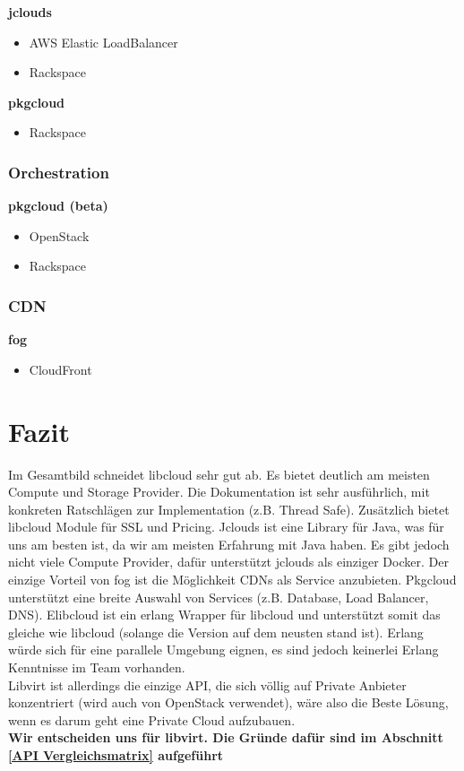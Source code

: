 \textbf{jclouds}
\begin{multicols}{2}
\begin{itemize}
\item AWS Elastic LoadBalancer
\item Rackspace
\end{itemize}
\end{multicols}

\textbf{pkgcloud}
\begin{itemize}
\item Rackspace
\end{itemize}
\newpage
\subsubsection{Orchestration}
\textbf{pkgcloud (beta)}
\begin{multicols}{2}
\begin{itemize}
\item OpenStack
\item Rackspace
\end{itemize}
\end{multicols}

\subsubsection{CDN}
\textbf{fog}
\begin{itemize}
\item CloudFront
\end{itemize}

\newpage

\section{Fazit}

Im Gesamtbild schneidet libcloud sehr gut ab. Es bietet deutlich am meisten Compute und 
Storage Provider. Die Dokumentation ist sehr ausführlich, mit konkreten Ratschlägen zur 
Implementation (z.B. Thread Safe). Zusätzlich bietet libcloud Module für SSL und Pricing.
Jclouds ist eine Library für Java, was für uns am besten ist, da wir am meisten Erfahrung mit 
Java haben. Es gibt jedoch nicht viele Compute Provider, dafür unterstützt jclouds als einziger Docker.
Der einzige Vorteil von fog ist die Möglichkeit CDNs als Service anzubieten.
Pkgcloud unterstützt eine breite Auswahl von Services (z.B. Database, Load Balancer, DNS).
Elibcloud ist ein erlang Wrapper für libcloud und unterstützt somit das gleiche wie libcloud 
(solange die Version auf dem neusten stand ist). Erlang würde sich für eine parallele Umgebung eignen, 
es sind jedoch keinerlei Erlang Kenntnisse im Team vorhanden.\\
Libvirt ist allerdings die einzige API, die sich völlig auf Private Anbieter 
konzentriert (wird auch von OpenStack verwendet), wäre also die Beste 
Lösung, wenn es darum geht eine Private Cloud aufzubauen.
\\
\textbf{Wir entscheiden uns für libvirt. Die Gründe dafür sind im Abschnitt \ref{API Vergleichsmatrix} aufgeführt}


